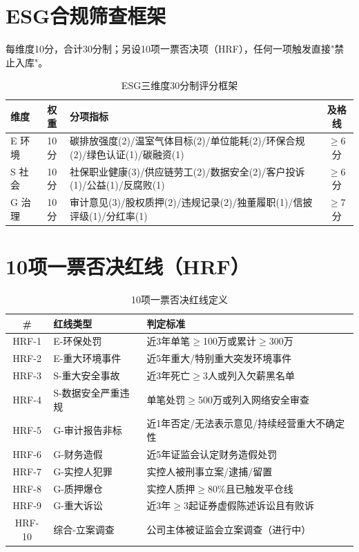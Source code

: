 \section{ESG合规筛查框架}

每维度10分，合计30分制；另设10项一票否决项（HRF），任何一项触发直接"禁止入库"。

\begin{table}[H]
\centering\scriptsize
\renewcommand{\arraystretch}{1.1}
\begin{tabularx}{\textwidth}{l c X c}
\toprule
\textbf{维度} & \textbf{权重} & \textbf{分项指标} & \textbf{及格线} \\
\midrule
E 环境 & 10分 & 碳排放强度(2)/温室气体目标(2)/单位能耗(2)/环保合规(2)/绿色认证(1)/碳融资(1) & $\geq$6分 \\
S 社会 & 10分 & 社保职业健康(3)/供应链劳工(2)/数据安全(2)/客户投诉(1)/公益(1)/反腐败(1) & $\geq$6分 \\
G 治理 & 10分 & 审计意见(3)/股权质押(2)/违规记录(2)/独董履职(1)/信披评级(1)/分红率(1) & $\geq$7分 \\
\bottomrule
\end{tabularx}
\caption{ESG三维度30分制评分框架}
\end{table}

\section{10项一票否决红线（HRF）}

\begin{table}[H]
\centering\scriptsize
\renewcommand{\arraystretch}{1.1}
\begin{tabularx}{\textwidth}{c l X}
\toprule
\textbf{\#} & \textbf{红线类型} & \textbf{判定标准} \\
\midrule
HRF-1 & E-环保处罚 & 近3年单笔$\geq$100万或累计$\geq$300万 \\
HRF-2 & E-重大环境事件 & 近5年重大/特别重大突发环境事件 \\
HRF-3 & S-重大安全事故 & 近3年死亡$\geq$3人或列入欠薪黑名单 \\
HRF-4 & S-数据安全严重违规 & 单笔处罚$\geq$500万或列入网络安全审查 \\
HRF-5 & G-审计报告非标 & 近1年否定/无法表示意见/持续经营重大不确定性 \\
HRF-6 & G-财务造假 & 近5年证监会认定财务造假处罚 \\
HRF-7 & G-实控人犯罪 & 实控人被刑事立案/逮捕/留置 \\
HRF-8 & G-质押爆仓 & 实控人质押$\geq$80\%且已触发平仓线 \\
HRF-9 & G-重大诉讼 & 近3年$\geq$3起证券虚假陈述诉讼且有败诉 \\
HRF-10 & 综合-立案调查 & 公司主体被证监会立案调查（进行中） \\
\bottomrule
\end{tabularx}
\caption{10项一票否决红线定义}
\end{table}


